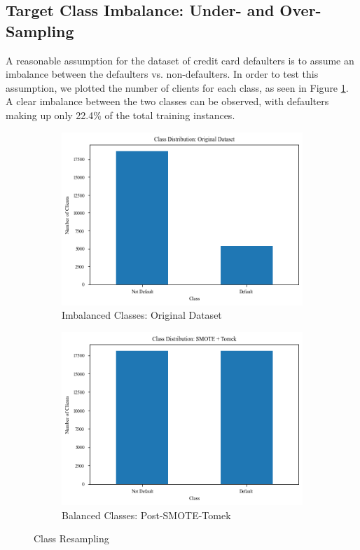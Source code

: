 \documentclass{article}
\begin{document}
\subsection{Target Class Imbalance: Under- and Over-Sampling}

A reasonable assumption for the dataset of credit card defaulters is to assume an imbalance between the defaulters vs. non-defaulters. In order to test this assumption, we plotted the number of clients for each class, as seen in Figure \ref{fig:class_imbalance}. A clear imbalance between the two classes can be observed, with defaulters making up only 22.4\% of the total training instances. 

\begin{figure}[ht]
	\centering
	\begin{subfigure}{.5\textwidth}
		\centering
		\includegraphics[width=.8\linewidth]{class_imbalance}
		\caption{Imbalanced Classes: Original Dataset}
		\label{fig:class_imbalance}
	\end{subfigure}%
	\begin{subfigure}{.5\textwidth}
		\centering
		\includegraphics[width=.8\linewidth]{class_balance}
		\caption{Balanced Classes: Post-SMOTE-Tomek}
		\label{fig:class_balance}
	\end{subfigure}
	\label{fig:resampling}
	\caption{Class Resampling}
\end{figure}
\end{document}
